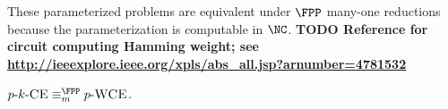 \documentclass{article}
\newcommand{\todo}[1]{\textbf{TODO #1}}
\newcommand{\dash}{\textnormal{-}}
\newcommand{\pCkE}{p \dash k \dash \textsc{CE}}
\newcommand{\pWCE}{p \dash \textsc{WCE}}
\begin{document}
These parameterized problems are equivalent under $\FPP$ many-one reductions because the parameterization is computable in $\NC$.
\todo{Reference for circuit computing Hamming weight; see \url{http://ieeexplore.ieee.org/xpls/abs_all.jsp?arnumber=4781532}}

\begin{proposition}
  $\pCkE \equiv_m^{\FPP} \pWCE$.
\end{proposition}



\end{document}
